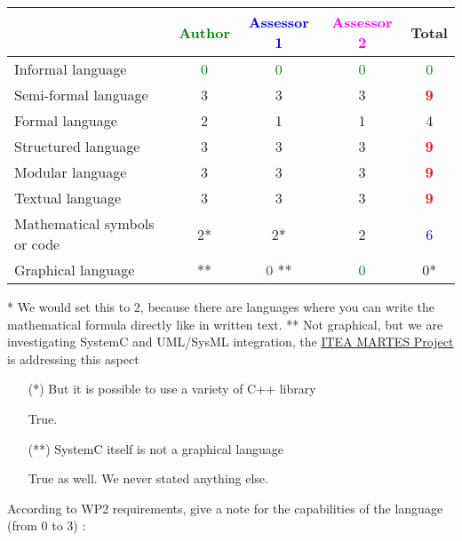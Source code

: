 \begin{tabular}{|l | c | c | c | c|}
\hline
& \textcolor{green}{Author} & \textcolor{blue}{Assessor 1} & \textcolor{magenta}{Assessor 2} & Total \\
\hline
Informal language & \textcolor{green}{0}   & \textcolor{green}{0} & \textcolor{green}{0} & \textcolor{green}{0} \\
\hline
Semi-formal language &3 & 3    & 3     & \textcolor{red}{\textbf{9}} \\
\hline
Formal language &2 &1 & 1     & 4     \\
\hline
Structured language &3 &3 & 3     & \textcolor{red}{\textbf{9}} \\
\hline
Modular language &3 &3 & 3     & \textcolor{red}{\textbf{9}}  \\
\hline
Textual language &3 &3 & 3     & \textcolor{red}{\textbf{9}} \\
\hline
Mathematical symbols or code &2* &2* & 2     & \textcolor{blue}{6} \\
\hline
Graphical language &** & \textcolor{green}{0} **& \textcolor{green}{0} &  0* \\
\hline
\end{tabular}

\begin{author_comment}
* We would set this to 2, because there are languages where you can write the mathematical formula directly like in written text.
** Not graphical, but we are investigating SystemC and UML/SysML integration, the \href{http://www.martes-idea.org/}{ITEA MARTES Project} is addressing this aspect
\end{author_comment}
\begin{assessor1}
\begin{itemize}
\item[(*)] But it is possible to use a variety of C++ library
\begin{author_comment}
True.
\end{author_comment}
\item[(**)] SystemC itself is not a graphical language
\begin{author_comment}
True as well. We never stated anything else.
\end{author_comment}
\end{itemize}
\end{assessor1}

According to WP2 requirements, give a note for the capabilities of the language (from 0 to 3) :

